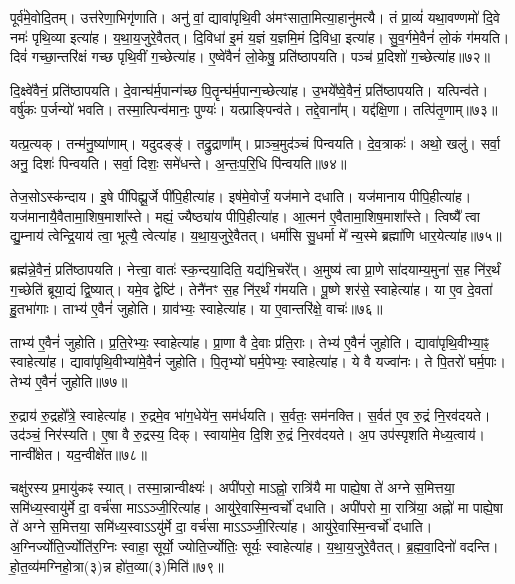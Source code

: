 पूर्व॑मे॒वोदि॒तम्। 
उत्त॑रेणा॒भिगृ॑णाति। 
अनु॑ वां॒ द्यावा॑पृथि॒वी अ॑मꣳसाता॒मित्या॒हानु॑मत्यै। 
तं प्रा॒व्यं॑ यथा॒वण्णमो॑ दि॒वे नमः॑ पृथि॒व्या इत्या॑ह। 
य॒था॒य॒जुरे॒वैतत्। 
दि॒विधा॑ इ॒मं य॒ज्ञं य॒ज्ञमि॒मं दि॒विधा॒ इत्या॑ह। 
सु॒व॒र्गमे॒वैनं॑ लो॒कं ग॑मयति। 
दिवं॑ गच्छा॒न्तरि॑क्षं गच्छ पृथि॒वीं ग॒च्छेत्या॑ह। 
ए॒ष्वे॑वैनं॑ लो॒केषु॒ प्रति॑ष्ठापयति। 
पञ्च॑ प्र॒दिशो॑ ग॒च्छेत्या॑ह॥७२॥

दि॒क्ष्वे॑वैनं॒ प्रति॑ष्ठापयति। 
दे॒वान्घ॑र्म॒पान्ग॑च्छ पि॒तॄन्घ॑र्म॒\-पान्ग॒च्छे\-त्या॑ह। 
उ॒भये᳚ष्वे॒वैनं॒ प्रति॑ष्ठापयति। 
यत्पिन्व॑ते। 
वर्\mbox{}षु॑कः प॒र्जन्यो॑ भवति। 
तस्मा॒त्पिन्व॑मानः॒ पुण्यः॑। 
यत्प्राङ्पिन्व॑ते। 
तद्दे॒वाना᳚म्। 
यद्द॑क्षि॒णा। 
तत्पि॑तृ॒णाम्॥७३॥

यत्प्र॒त्यक्। 
तन्म॑नु॒ष्या॑णाम्। 
यदुदङ्ङ्॑। 
तद्रु॒द्राणा᳚म्। 
प्राञ्च॒मुद॑ञ्चं पिन्वयति। 
दे॒व॒त्राकः॑। 
अथो॒ खलु॑। 
सर्वा॒ अनु॒ दिशः॑ पिन्वयति। 
सर्वा॒ दिशः॒ समे॑धन्ते। 
अ॒न्तः॒प॒रि॒धि पि॑न्वयति॥७४॥

तेज॒सोऽस्क॑न्दाय। 
इ॒षे पी॑पिह्यू॒र्जे पी॑पि॒हीत्या॑ह। 
इष॑मे॒वोर्जं॒ यज॑माने दधाति। 
यज॑मानाय पीपि॒हीत्या॑ह। 
यज॑मानायै॒वैतामा॒शिष॒माशा᳚स्ते। 
मह्यं॒ ज्यैष्ठ्या॑य पीपि॒हीत्या॑ह। 
आ॒त्मन॑ ए॒वैतामा॒शिष॒माशा᳚स्ते। 
त्विष्यै᳚ त्वा द्यु॒म्नाय॑ त्वेन्द्रि॒याय॑ त्वा॒ भूत्यै॒ त्वेत्या॑ह। 
य॒था॒य॒जुरे॒वैतत्। 
धर्मा॑सि सु॒धर्मा मे᳚ न्य॒स्मे ब्रह्मा॑णि धार॒येत्या॑ह॥७५॥

ब्रह्म॑न्ने॒वैनं॒ प्रति॑ष्ठापयति। 
नेत्त्वा॒ वातः॑ स्क॒न्दया॒दिति॒ यद्य॑भि॒चरे᳚त्। 
अ॒मुष्य॑ त्वा प्रा॒णे सा॑दयाम्य॒मुना॑ स॒ह नि॑र॒र्थं ग॒च्छेति॑ ब्रूया॒द्यं द्वि॒ष्यात्। 
यमे॒व द्वेष्टि॑। 
तेनै॑नꣳ स॒ह नि॑र॒र्थं ग॑मयति। 
पू॒ष्णे शर॑से॒ स्वाहेत्या॑ह। 
या ए॒व दे॒वता॑ हु॒तभा॑गाः। 
ताभ्य॑ ए॒वैनं॑ जुहोति। 
ग्राव॑भ्यः॒ स्वाहेत्या॑ह। 
या ए॒वान्तरि॑क्षे॒ वाचः॑॥७६॥

ताभ्य॑ ए॒वैनं॑ जुहोति। 
प्र॒ति॒रेभ्यः॒ स्वाहेत्या॑ह। 
प्रा॒णा वै दे॒वाः प्र॑ति॒राः। 
तेभ्य॑ ए॒वैनं॑ जुहोति। 
द्यावा॑पृथि॒वीभ्या॒ꣴ॒ स्वाहेत्या॑ह। 
द्यावा॑पृथि॒वीभ्या॑मे॒वैनं॑ जुहोति। 
पि॒तृभ्यो॑ घर्म॒पेभ्यः॒ स्वाहेत्या॑ह। 
ये वै यज्वा॑नः। 
ते पि॒तरो॑ घर्म॒पाः। 
तेभ्य॑ ए॒वैनं॑ जुहोति॥७७॥

रु॒द्राय॑ रु॒द्रहो᳚त्रे॒ स्वाहेत्या॑ह। 
रु॒द्रमे॒व भा॑ग॒धेये॑न॒ सम॑र्धयति। 
स॒र्वतः॒ सम॑नक्ति। 
स॒र्वत॑ ए॒व रु॒द्रं नि॒रव॑दयते। 
उद॑ञ्चं॒ निर॑स्यति। 
ए॒षा वै रु॒द्रस्य॒ दिक्। 
स्वाया॑मे॒व दि॒शि रु॒द्रं नि॒रव॑दयते। 
अ॒प उप॑स्पृशति मेध्य॒त्वाय॑। 
नान्वी᳚क्षेत। 
यद॒न्वीक्षे॑त॥७८॥

चक्षु॑रस्य प्र॒मायु॑कꣴ स्यात्। 
तस्मा॒न्नान्वीक्ष्यः॑। 
अपी॑परो॒ माऽह्नो॒ रात्रि॑यै मा पाह्ये॒षा ते॑ अग्ने स॒मित्तया॒ समि॑ध्य॒स्वायु॑र्मे दा॒ वर्च॑सा माऽऽञ्जी॒रित्या॑ह। 
आयु॑रे॒वास्मि॒न्वर्चो॑ दधाति। 
अपी॑परो मा॒ रात्रि॑या॒ अह्नो॑ मा पाह्ये॒षा ते॑ अग्ने स॒मित्तया॒ समि॑ध्य॒स्वाऽऽयु॑र्मे दा॒ वर्च॑सा माऽऽञ्जी॒रित्या॑ह। 
आयु॑रे॒वास्मि॒न्वर्चो॑ दधाति। 
अ॒ग्निर्ज्योति॒र्ज्योति॑र॒ग्निः स्वाहा॒ सूर्यो॒ ज्योति॒र्ज्योतिः॒ सूर्यः॒ स्वाहेत्या॑ह। 
य॒था॒य॒जुरे॒वैतत्। 
ब्र॒ह्म॒वा॒दिनो॑ वदन्ति। 
हो॒त॒व्य॑मग्निहो॒त्रा(३)न्न हो॑त॒व्या(३)मिति॑॥७९॥

